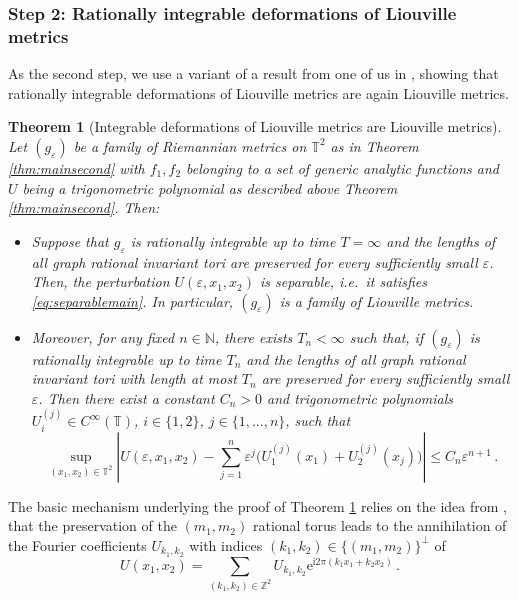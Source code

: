 \documentclass[11pt,letterpaper,oneside]{amsart}
\newcommand{\Z}{\mathbb{Z}}
\newcommand{\N}{\mathbb{N}}
\newcommand{\T}{\mathbb{T}}
\renewcommand{\epsilon}{\varepsilon}
\newtheorem{theo}{Theorem}[section]
\theoremstyle{definition}
\theoremstyle{remark}
\theoremstyle{definition}
\theoremstyle{remark}
\begin{document}
\subsubsection*{Step 2: Rationally integrable deformations of Liouville metrics}
As the second step, we use a variant of a result from one of us in \cite{henheik2025deformational}, showing that rationally integrable deformations of Liouville metrics are again Liouville metrics. 
{
\begin{theo}[Integrable deformations of Liouville metrics are Liouville metrics]\label{thm:RI implies liouv}
    Let $(g_\epsilon)$ be a family of Riemannian metrics on $\T^2$ as in Theorem \ref{thm:mainsecond} with $f_1, f_2$ belonging to a set of generic analytic functions and $U$ being a trigonometric polynomial as described above Theorem \ref{thm:mainsecond}. Then: 
\begin{itemize}
    \item[(i)]     Suppose that $g_\epsilon$ is rationally integrable up to time $T = \infty$ and the lengths of all graph rational invariant tori are preserved for every sufficiently small $\epsilon$. 
    Then, the perturbation $U(\epsilon, x_1, x_2)$ is \emph{separable}, i.e.~it satisfies \eqref{eq:separablemain}. In particular, $(g_\epsilon)$ is a family of Liouville metrics. 
    \item[(ii)]     Moreover, for any fixed $n \in \N$, there exists $T_n < \infty$ such that, if $(g_\epsilon)$ is rationally integrable up to time $T_n$ and the lengths of all graph rational invariant tori with length  at most $T_n$ are preserved for every sufficiently small $\epsilon$. Then there exist a constant $C_n> 0$ and trigonometric polynomials $U_i^{(j)} \in C^\infty(\T)$, $i \in\{1,2\}$, $j \in \{1,...,n\}$, such that 
    \begin{equation} \label{eq:orderbyorderstatement}
        \sup_{(x_1, x_2) \in \T^2} \left|U(\epsilon, x_1, x_2) - \sum_{j=1}^n \epsilon^j \big( U_1^{(j)}(x_1) + U_2^{(j)}(x_j)\big)\right| \le C_n \epsilon^{n+1} \,. 
    \end{equation}
    
\end{itemize}
\end{theo}
}
The basic mechanism underlying the proof of Theorem \ref{thm:RI implies liouv} relies on the idea from \cite{henheik2025deformational}, that the preservation of the $(m_1, m_2)$ rational torus leads to the annihilation of the Fourier coefficients $U_{k_1, k_2}$ with indices $(k_1, k_2) \in \{(m_1, m_2)\}^\perp$ of 
\begin{equation*}
    U(x_1, x_2) = \sum_{(k_1, k_2) \in \Z^2} U_{k_1, k_2} \mathrm{e}^{\mathrm{i} 2 \pi (k_1 x_1 + k_2 x_2)} \,. 
\end{equation*}
\end{document}
